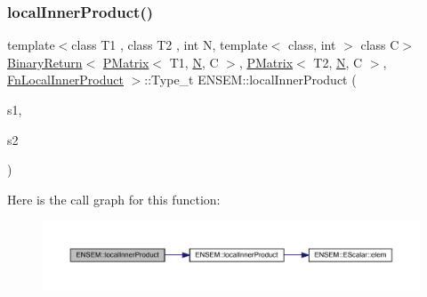 \subsubsection{\texorpdfstring{localInnerProduct()}{localInnerProduct()}\hspace{0.1cm}{\footnotesize\ttfamily [1/3]}}
{\footnotesize\ttfamily template$<$class T1 , class T2 , int N, template$<$ class, int $>$ class C$>$ \\
\mbox{\hyperlink{structENSEM_1_1BinaryReturn}{Binary\+Return}}$<$ \mbox{\hyperlink{classENSEM_1_1PMatrix}{P\+Matrix}}$<$ T1, \mbox{\hyperlink{adat__devel_2lib_2hadron_2operator__name__util_8cc_a7722c8ecbb62d99aee7ce68b1752f337}{N}}, C $>$, \mbox{\hyperlink{classENSEM_1_1PMatrix}{P\+Matrix}}$<$ T2, \mbox{\hyperlink{adat__devel_2lib_2hadron_2operator__name__util_8cc_a7722c8ecbb62d99aee7ce68b1752f337}{N}}, C $>$, \mbox{\hyperlink{structENSEM_1_1FnLocalInnerProduct}{Fn\+Local\+Inner\+Product}} $>$\+::Type\+\_\+t E\+N\+S\+E\+M\+::local\+Inner\+Product (\begin{DoxyParamCaption}\item[{const \mbox{\hyperlink{classENSEM_1_1PMatrix}{P\+Matrix}}$<$ T1, \mbox{\hyperlink{adat__devel_2lib_2hadron_2operator__name__util_8cc_a7722c8ecbb62d99aee7ce68b1752f337}{N}}, C $>$ \&}]{s1,  }\item[{const \mbox{\hyperlink{classENSEM_1_1PMatrix}{P\+Matrix}}$<$ T2, \mbox{\hyperlink{adat__devel_2lib_2hadron_2operator__name__util_8cc_a7722c8ecbb62d99aee7ce68b1752f337}{N}}, C $>$ \&}]{s2 }\end{DoxyParamCaption})\hspace{0.3cm}{\ttfamily [inline]}}

Here is the call graph for this function\+:\nopagebreak
\begin{figure}[H]
\begin{center}
\leavevmode
\includegraphics[width=350pt]{df/d0a/group__primmatrix_ga8ba784b1249c948dcff5b8fe086e2eb5_cgraph}
\end{center}
\end{figure}
\mbox{\label{group__primmatrix_gafc7ce30ddacb0b13e2db237cfa268161}} 
